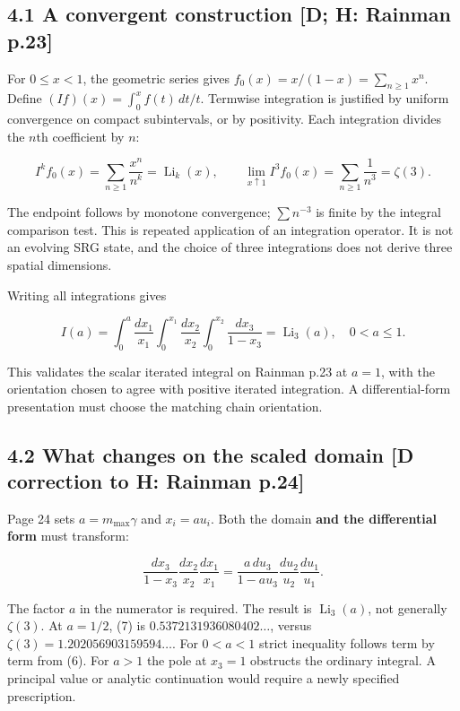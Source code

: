 \documentclass[11pt,a4paper]{article}
\begin{document}
\subsection*{4.1 A convergent construction [D; H: Rainman p.23]}

For $0\leq x<1$, the geometric series gives $f_0(x)=x/(1-x)=\sum_{n\geq1}x^n$. Define
$(If)(x)=\int_0^x f(t)\,dt/t$. Termwise integration is justified by uniform convergence on compact subintervals, or by positivity. Each integration divides the $n$th coefficient by $n$:


\[
I^kf_0(x)=\sum_{n\geq1}\frac{x^n}{n^k}
=\operatorname{Li}_k(x),\qquad
\lim_{x\uparrow1}I^3f_0(x)=\sum_{n\geq1}\frac1{n^3}=\zeta(3). \tag{6}
\]

The endpoint follows by monotone convergence; $\sum n^{-3}$ is finite by the integral comparison test. This is repeated application of an integration operator. It is not an evolving SRG state, and the choice of three integrations does not derive three spatial dimensions.


Writing all integrations gives


\[
I(a)=\int_0^a\frac{dx_1}{x_1}
\int_0^{x_1}\frac{dx_2}{x_2}
\int_0^{x_2}\frac{dx_3}{1-x_3}
=\operatorname{Li}_3(a),\quad0<a\leq1. \tag{7}
\]

This validates the scalar iterated integral on Rainman p.23 at $a=1$, with the orientation chosen to agree with positive iterated integration. A differential-form presentation must choose the matching chain orientation.


\subsection*{4.2 What changes on the scaled domain [D correction to H: Rainman p.24]}

Page 24 sets $a=m_{\max}\gamma$ and $x_i=a u_i$. Both the domain \textbf{and the differential form} must transform:


\[
\frac{dx_3}{1-x_3}\frac{dx_2}{x_2}\frac{dx_1}{x_1}
=\frac{a\,du_3}{1-a u_3}\frac{du_2}{u_2}\frac{du_1}{u_1}. \tag{8}
\]

The factor $a$ in the numerator is required. The result is $\operatorname{Li}_3(a)$, not generally $\zeta(3)$. At $a=1/2$, (7) is $0.5372131936080402\ldots$, versus $\zeta(3)=1.202056903159594\ldots$. For $0<a<1$ strict inequality follows term by term from (6). For $a>1$ the pole at $x_3=1$ obstructs the ordinary integral. A principal value or analytic continuation would require a newly specified prescription.
\end{document}
